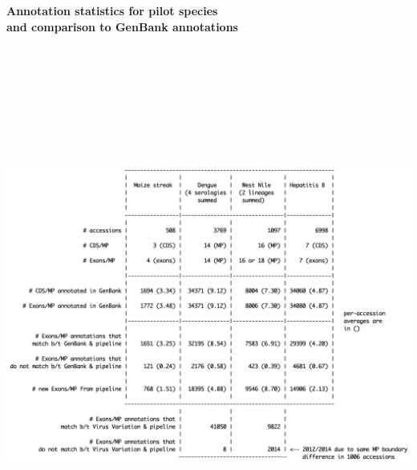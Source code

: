 \documentclass[landscape]{slides}
\begin{document}
\begin{slide}
\begin{center}
\textbf{Annotation statistics for pilot species \\ and comparison to
  GenBank annotations}

\includegraphics[height=7in]{figs/pilot-genbank-viv-comparison-table}
\vfill
\end{center}
\end{slide}
\end{document}
